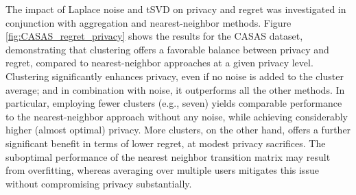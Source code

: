 \documentclass{article}
\begin{document}


The impact of Laplace noise and tSVD on privacy and regret was investigated in conjunction with aggregation and nearest-neighbor methods. Figure \ref{fig:CASAS_regret_privacy} shows the results for the CASAS dataset, demonstrating that clustering offers a favorable balance between privacy and regret, compared to nearest-neighbor approaches at a given privacy level. Clustering significantly enhances privacy, even if no noise is added to the cluster average; and in combination with noise, it outperforms all the other methods. In particular, employing fewer clusters (e.g., seven) yields comparable performance to the nearest-neighbor approach without any noise, while achieving considerably higher (almost optimal) privacy. More clusters, on the other hand, %
offers a further significant benefit in terms of lower regret, at modest privacy sacrifices.
The suboptimal performance of the nearest neighbor transition matrix may result from overfitting, whereas averaging over multiple users mitigates this issue without compromising privacy substantially.
\end{document}
